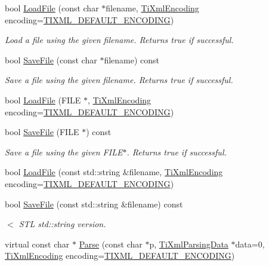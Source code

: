\begin{DoxyCompactItemize}
bool \hyperlink{class_ti_xml_document_a879cdf5e981b8b2d2ef82f2546dd28fb}{Load\+File} (const char $\ast$filename, \hyperlink{tinyxml_8h_a88d51847a13ee0f4b4d320d03d2c4d96}{Ti\+Xml\+Encoding} encoding=\hyperlink{tinyxml_8h_ad5b8b092878e9010d6400cb6c13d4879}{T\+I\+X\+M\+L\+\_\+\+D\+E\+F\+A\+U\+L\+T\+\_\+\+E\+N\+C\+O\+D\+I\+NG})
\begin{DoxyCompactList}\small\item\em Load a file using the given filename. Returns true if successful. \end{DoxyCompactList}\item 
bool \hyperlink{class_ti_xml_document_ae641f33784381017c44e107cc2c86b5c}{Save\+File} (const char $\ast$filename) const
\begin{DoxyCompactList}\small\item\em Save a file using the given filename. Returns true if successful. \end{DoxyCompactList}\item 
bool \hyperlink{class_ti_xml_document_a41f6fe7200864d1dca663d230caf8db6}{Load\+File} (F\+I\+LE $\ast$, \hyperlink{tinyxml_8h_a88d51847a13ee0f4b4d320d03d2c4d96}{Ti\+Xml\+Encoding} encoding=\hyperlink{tinyxml_8h_ad5b8b092878e9010d6400cb6c13d4879}{T\+I\+X\+M\+L\+\_\+\+D\+E\+F\+A\+U\+L\+T\+\_\+\+E\+N\+C\+O\+D\+I\+NG})
\item 
bool \hyperlink{class_ti_xml_document_a8f5a1022168a5767e32becec7b6f44ee}{Save\+File} (F\+I\+LE $\ast$) const
\begin{DoxyCompactList}\small\item\em Save a file using the given F\+I\+L\+E$\ast$. Returns true if successful. \end{DoxyCompactList}\item 
bool \hyperlink{class_ti_xml_document_a18ae6ed34fed7991ebc220862dfac884}{Load\+File} (const std\+::string \&filename, \hyperlink{tinyxml_8h_a88d51847a13ee0f4b4d320d03d2c4d96}{Ti\+Xml\+Encoding} encoding=\hyperlink{tinyxml_8h_ad5b8b092878e9010d6400cb6c13d4879}{T\+I\+X\+M\+L\+\_\+\+D\+E\+F\+A\+U\+L\+T\+\_\+\+E\+N\+C\+O\+D\+I\+NG})
\item 
bool \hyperlink{class_ti_xml_document_a2b3d316ed658852876d4852cd39c42d8}{Save\+File} (const std\+::string \&filename) const
\begin{DoxyCompactList}\small\item\em $<$ S\+TL std\+::string version. \end{DoxyCompactList}\item 
virtual const char $\ast$ \hyperlink{class_ti_xml_document_a789ad2f06f93d52bdb5570b2f3670289}{Parse} (const char $\ast$p, \hyperlink{class_ti_xml_parsing_data}{Ti\+Xml\+Parsing\+Data} $\ast$data=0, \hyperlink{tinyxml_8h_a88d51847a13ee0f4b4d320d03d2c4d96}{Ti\+Xml\+Encoding} encoding=\hyperlink{tinyxml_8h_ad5b8b092878e9010d6400cb6c13d4879}{T\+I\+X\+M\+L\+\_\+\+D\+E\+F\+A\+U\+L\+T\+\_\+\+E\+N\+C\+O\+D\+I\+NG})

\end{DoxyCompactItemize}
